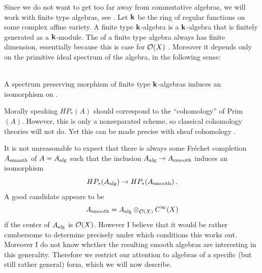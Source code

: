 Since we do not want to get too far away from commutative
algebras, we will work with finite type algebras, see
\cite{KNS,BaNi}. Let $\mathbf k$ be the ring of regular functions on
some complex affine variety. A finite type $\mathbf k$-algebra is a
$\mathbf k$-algebra that is finitely generated as a $\mathbf k$-module.
The \pch of a finite type algebra always has finite dimension,
essentially because this is case for $\mathcal O (X)$ \cite[Theorem 1]{KNS}. 
Moreover it depends only on the primitive ideal spectrum
of the algebra, in the following sense:

\begin{thm}\label{thm:1.1} \textup{\cite[Theorem 8]{BaNi}}\\
A spectrum preserving morphism of finite type $\mathbf k$-algebras
induces an isomorphism on \pch \!.
\end{thm}

Morally speaking $HP_* (A)$ should correspond to the ``cohomology'' of Prim$ (A)$.
However, this is only a nonseparated scheme, so classical cohomology theories will 
not do. Yet this can be made precise with sheaf cohomology \cite[Section 2.2]{Sol3}.

It is not unreasonable to expect that there is always some
Fr\'echet completion $A_\mathrm{smooth}$ of $A = A_\mathrm{alg}$ such that the inclusion 
$A_\mathrm{alg} \to A_\mathrm{smooth}$ induces an isomorphism
\begin{equation}\label{eq:1.4}
HP_* (A_\mathrm{alg} ) \to HP_* (A_\mathrm{smooth} ) \,.
\end{equation}
A good candidate appears to be
\begin{equation}
A_\mathrm{smooth} = A_\mathrm{alg} \otimes_{\mathcal O (X)} C^\infty (X)
\end{equation}
if the center of $A_\mathrm{alg}$ is $\mathcal O (X)$. However I believe that it
would be rather cumbersome to determine precisely under which conditions this
works out. Moreover I do not know whether the resulting smooth
algebras are interesting in this generality. Therefore we restrict
our attention to algebras of a specific (but still rather general) form,
which we will now describe.

